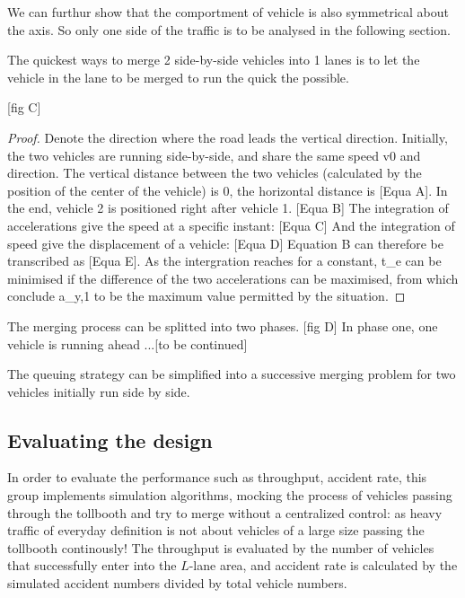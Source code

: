 \documentclass{mcmthesis}
\begin{document}
We can furthur show that the comportment of vehicle is also symmetrical about the axis. So only one side of the traffic is to be analysed in the following section.

\begin{Theorem} \label{thm:latex}
The quickest ways to merge 2 side-by-side vehicles into 1 lanes is to let the vehicle in the lane to be merged to run the quick the possible.
\end{Theorem}
[fig C]
\begin{proof}
Denote the direction where the road leads the vertical direction.
Initially, the two vehicles are running side-by-side, and share the same speed v0 and direction.
The vertical distance between the two vehicles (calculated by the position of the center of the vehicle) is 0, the horizontal distance is [Equa A].
In the end, vehicle 2 is positioned right after vehicle 1.
[Equa B]
The integration of accelerations give the speed at a specific instant:
[Equa C]
And the integration of speed give the displacement of a vehicle:
[Equa D]
Equation B can therefore be transcribed as 
[Equa E].
As the intergration reaches for a constant, t_e can be minimised if the difference of the two accelerations can be maximised, from which conclude a_y,1 to be the maximum value permitted by the situation.
\end{proof}

The merging process can be splitted into two phases. [fig D] In phase one, one vehicle is running ahead ...[to be continued]

\begin{Theorem} \label{thm:latex}
The queuing strategy can be simplified into a successive merging problem for two vehicles initially run side by side.
\end{Theorem}

\subsection{Evaluating the design}

In order to evaluate the performance such as throughput, accident rate, this group implements simulation algorithms, mocking the process of vehicles passing through the tollbooth and try to merge without a centralized control: as heavy traffic of everyday definition is not about vehicles of a large size passing the tollbooth continously! The throughput is evaluated by the number of vehicles that successfully enter into the $L$-lane area, and accident rate is calculated by the simulated accident numbers divided by total vehicle numbers.
\end{document}
